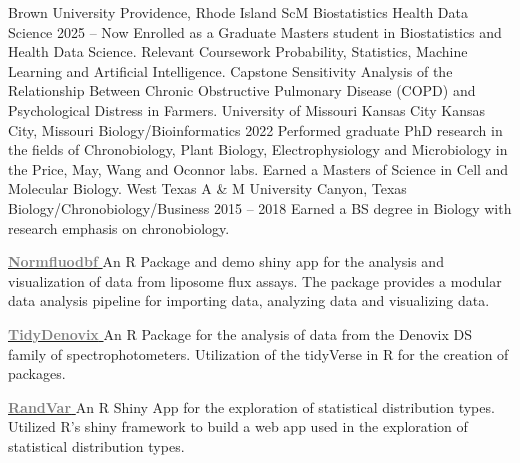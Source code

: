 \documentclass[9pt]{adeckcv} %
\begin{document}
\newpage


  

\begin{entrylist}
\entry
{\large{Brown University}} 
{Providence, Rhode Island}
{ScM Biostatistics Health Data Science}
{2025 -- Now}
{\itemizeeducationtwo
  {Enrolled as a Graduate Masters student in Biostatistics and Health Data Science.}
}
{Relevant Coursework Probability, Statistics, Machine Learning and Artificial Intelligence.}
  {Capstone Sensitivity Analysis of the Relationship Between Chronic Obstructive Pulmonary Disease (COPD) and Psychological Distress in Farmers.}
\entry
{\large{University of Missouri Kansas City}} 
{Kansas City, Missouri}
{Biology/Bioinformatics}
{2022}
{\itemizeeducationone
  {Performed graduate PhD research in the fields of Chronobiology, Plant Biology, Electrophysiology and Microbiology in the Price, May, Wang and Oconnor labs.}
  {Earned a Masters of Science in Cell and Molecular Biology.}
}
\entry
{\large{West Texas A \& M University}} 
{Canyon, Texas}
{Biology/Chronobiology/Business}
{2015 -- 2018}
{\itemizeeducationtwo
  {Earned a BS degree in Biology with research emphasis on chronobiology.}
}
\end{entrylist}

  

\project
{\href{https://alphaprime7.github.io/normfluodbf/}{\textbf{ \textcolor{gray}{Normfluodbf}} }}
{}
{}
{}
{An R Package and demo shiny app for the analysis and visualization of data from liposome flux assays.}
{The package provides a modular data analysis pipeline for importing data, analyzing data and visualizing data.}

\project
{\href{https://alphaprime7.github.io/tidyDenovix/}{\textbf{ \textcolor{gray}{TidyDenovix}} }}
{}
{}
{}
{An R Package for the analysis of data from the Denovix DS family of spectrophotometers.}
{Utilization of the tidyVerse in R for the creation of packages.}

\project
{\href{https://github.com/bhds2010/randvar}{\textbf{ \textcolor{gray}{RandVar}} }}
{}
{}
{}
{An R Shiny App for the exploration of statistical distribution types.}
{Utilized R's shiny framework to build a web app used in the exploration of statistical distribution types.}
\end{document}
